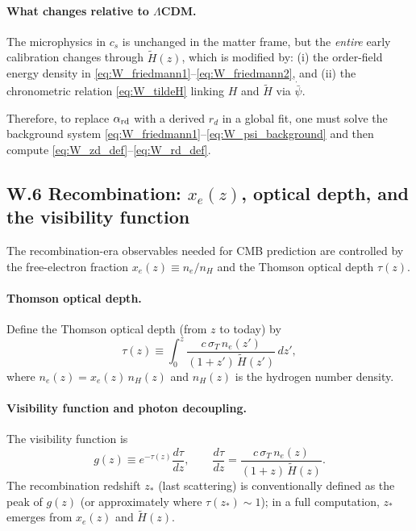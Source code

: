 \documentclass[10pt]{article}
\begin{document}
\paragraph{What changes relative to $\Lambda$CDM.}
The microphysics in $c_s$ is unchanged in the matter frame, but the \emph{entire} early calibration changes
through $\tilde H(z)$, which is modified by:
(i) the order-field energy density in \eqref{eq:W_friedmann1}--\eqref{eq:W_friedmann2}, and
(ii) the chronometric relation \eqref{eq:W_tildeH} linking $H$ and $\tilde H$ via $\dot{\bar\psi}$.

Therefore, to replace $\alpha_{\rm rd}$ with a derived $r_d$ in a global fit, one must solve the background
system \eqref{eq:W_friedmann1}--\eqref{eq:W_psi_background} and then compute \eqref{eq:W_zd_def}--\eqref{eq:W_rd_def}.

\subsection{W.6 Recombination: $x_e(z)$, optical depth, and the visibility function}
\label{app:early_universe:recombination}

The recombination-era observables needed for CMB prediction are controlled by the free-electron fraction
$x_e(z)\equiv n_e/n_H$ and the Thomson optical depth $\tau(z)$.

\paragraph{Thomson optical depth.}
Define the Thomson optical depth (from $z$ to today) by
\begin{equation}
\tau(z) \equiv \int_{0}^{z}
\frac{c\,\sigma_T\,n_e(z')}{(1+z')\,\tilde H(z')}\,dz',
\label{eq:W_tau_def}
\end{equation}
where $n_e(z)=x_e(z)\,n_H(z)$ and $n_H(z)$ is the hydrogen number density.

\paragraph{Visibility function and photon decoupling.}
The visibility function is
\begin{equation}
g(z) \equiv e^{-\tau(z)}\frac{d\tau}{dz},
\qquad
\frac{d\tau}{dz} = \frac{c\,\sigma_T\,n_e(z)}{(1+z)\,\tilde H(z)}.
\label{eq:W_visibility}
\end{equation}
The recombination redshift $z_\ast$ (last scattering) is conventionally defined as the peak of $g(z)$
(or approximately where $\tau(z_\ast)\sim 1$); in a full computation, $z_\ast$ emerges from $x_e(z)$ and $\tilde H(z)$.
\end{document}
